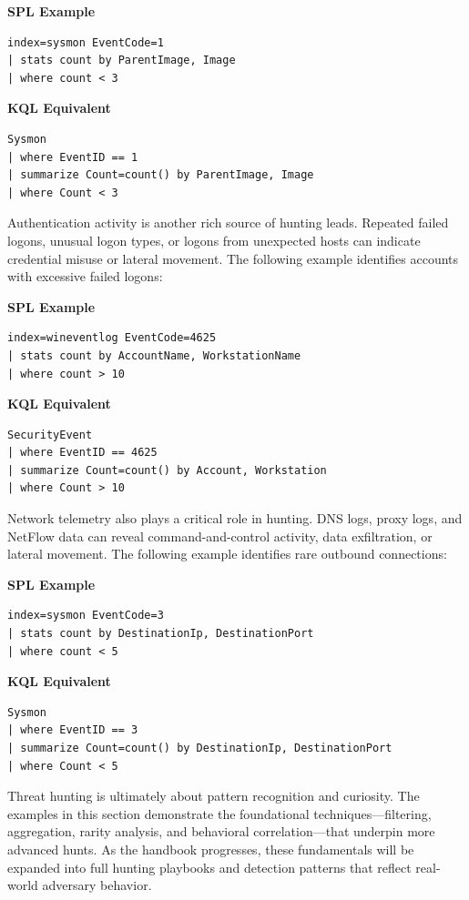 \textbf{SPL Example}
\begin{lstlisting}
index=sysmon EventCode=1
| stats count by ParentImage, Image
| where count < 3
\end{lstlisting}

\textbf{KQL Equivalent}
\begin{lstlisting}
Sysmon
| where EventID == 1
| summarize Count=count() by ParentImage, Image
| where Count < 3
\end{lstlisting}

Authentication activity is another rich source of hunting leads. Repeated failed logons, unusual logon types, or logons from unexpected 
hosts can indicate credential misuse or lateral movement. The following example identifies accounts with excessive failed logons:

\textbf{SPL Example}
\begin{lstlisting}
index=wineventlog EventCode=4625
| stats count by AccountName, WorkstationName
| where count > 10
\end{lstlisting}

\textbf{KQL Equivalent}
\begin{lstlisting}
SecurityEvent
| where EventID == 4625
| summarize Count=count() by Account, Workstation
| where Count > 10
\end{lstlisting}

Network telemetry also plays a critical role in hunting. DNS logs, proxy logs, and NetFlow data can reveal command-and-control activity, 
data exfiltration, or lateral movement. The following example identifies rare outbound connections:

\textbf{SPL Example}
\begin{lstlisting}
index=sysmon EventCode=3
| stats count by DestinationIp, DestinationPort
| where count < 5
\end{lstlisting}

\textbf{KQL Equivalent}
\begin{lstlisting}
Sysmon
| where EventID == 3
| summarize Count=count() by DestinationIp, DestinationPort
| where Count < 5
\end{lstlisting}

Threat hunting is ultimately about pattern recognition and curiosity. The examples in this section demonstrate the foundational 
techniques—filtering, aggregation, rarity analysis, and behavioral correlation—that underpin more advanced hunts. As the handbook 
progresses, these fundamentals will be expanded into full hunting playbooks and detection patterns that reflect real-world adversary 
behavior.
